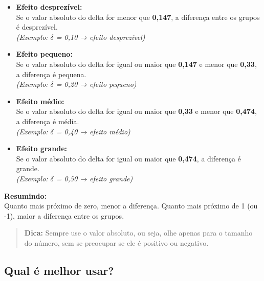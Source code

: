 \documentclass[
]{book}
\begin{document}
\begin{itemize}
\item
  \textbf{Efeito desprezível:}\\
  Se o valor absoluto do delta for menor que \textbf{0,147}, a diferença entre os grupos é desprezível.\\
  \emph{(Exemplo: \textbar{}\(\delta\)\textbar{} = 0,10 → efeito desprezível)}
\item
  \textbf{Efeito pequeno:}\\
  Se o valor absoluto do delta for igual ou maior que \textbf{0,147} e menor que \textbf{0,33}, a diferença é pequena.\\
  \emph{(Exemplo: \textbar{}\(\delta\)\textbar{} = 0,20 → efeito pequeno)}
\item
  \textbf{Efeito médio:}\\
  Se o valor absoluto do delta for igual ou maior que \textbf{0,33} e menor que \textbf{0,474}, a diferença é média.\\
  \emph{(Exemplo: \textbar{}\(\delta\)\textbar{} = 0,40 → efeito médio)}
\item
  \textbf{Efeito grande:}\\
  Se o valor absoluto do delta for igual ou maior que \textbf{0,474}, a diferença é grande.\\
  \emph{(Exemplo: \textbar{}\(\delta\)\textbar{} = 0,50 → efeito grande)}
\end{itemize}

\textbf{Resumindo:}\\
Quanto mais próximo de zero, menor a diferença. Quanto mais próximo de 1 (ou -1), maior a diferença entre os grupos.

\begin{quote}
\textbf{Dica:} Sempre use o valor absoluto, ou seja, olhe apenas para o tamanho do número, sem se preocupar se ele é positivo ou negativo.
\end{quote}

\subsection{Qual é melhor usar?}\label{qual-uxe9-melhor-usar}
\end{document}
